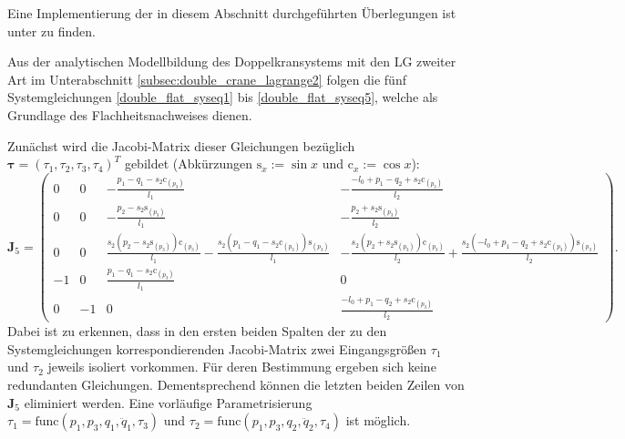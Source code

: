 Eine Implementierung der in diesem Abschnitt durchgeführten Überlegungen ist unter \cite[flatness\_notebooks/ODE\_flatness\_analysis.ipynb]{SAGithub} zu finden.

Aus der analytischen Modellbildung des Doppelkransystems mit den LG zweiter Art im Unterabschnitt \ref{subsec:double_crane_lagrange2} folgen die fünf Systemgleichungen \eqref{double_flat_syseq1} bis \eqref{double_flat_syseq5}, welche als Grundlage des Flachheitsnachweises dienen. 

Zunächst wird die Jacobi-Matrix dieser Gleichungen bezüglich $\boldsymbol{\tau} = (\tau_1, \tau_2, \tau_3, \tau_4)^T$ gebildet (Abkürzungen $\mathrm{s}_x := \sin{x}$ und $\mathrm{c}_x := \cos{x}$):
\begin{equation*}
	\mathbf{J}_5 = 
	\left(\begin{smallmatrix}
	0 & 0 & - \frac{p_{1} - q_{1} - s_{2} \mathrm{c}_{\left(p_{3} \right)}}{l_{1}} & - \frac{- l_{0} + p_{1} - q_{2} + s_{2} \mathrm{c}_{\left(p_{3} \right)}}{l_{2}}\\
	0 & 0 & - \frac{p_{2} - s_{2} \mathrm{s}_{\left(p_{3} \right)}}{l_{1}} & - \frac{p_{2} + s_{2} \mathrm{s}_{\left(p_{3} \right)}}{l_{2}}\\
	0 & 0 & \frac{s_{2} \left(p_{2} - s_{2} \mathrm{s}_{\left(p_{3} \right)}\right) \mathrm{c}_{\left(p_{3} \right)}}{l_{1}} - \frac{s_{2} \left(p_{1} - q_{1} - s_{2} \mathrm{c}_{\left(p_{3} \right)}\right) \mathrm{s}_{\left(p_{3} \right)}}{l_{1}} & - \frac{s_{2} \left(p_{2} + s_{2} \mathrm{s}_{\left(p_{3} \right)}\right) \mathrm{c}_{\left(p_{3} \right)}}{l_{2}} + \frac{s_{2} \left(- l_{0} + p_{1} - q_{2} + s_{2} \mathrm{c}_{\left(p_{3} \right)}\right) \mathrm{s}_{\left(p_{3} \right)}}{l_{2}}\\
	-1 & 0 & \frac{p_{1} - q_{1} - s_{2} \mathrm{c}_{\left(p_{3} \right)}}{l_{1}} & 0\\
	0 & -1 & 0 & \frac{- l_{0} + p_{1} - q_{2} + s_{2} \mathrm{c}_{\left(p_{3} \right)}}{l_{2}}
	\end{smallmatrix}\right).
\end{equation*}
Dabei ist zu erkennen, dass in den ersten beiden Spalten der zu den Systemgleichungen korrespondierenden Jacobi-Matrix zwei Eingangsgrößen $\tau_{1}$ und $\tau_{2}$ jeweils isoliert vorkommen. Für deren Bestimmung ergeben sich keine redundanten Gleichungen. Dementsprechend können die letzten beiden Zeilen von $\mathbf{J}_5$ eliminiert werden. Eine vorläufige Parametrisierung $\tau_1 = \mathrm{func}(p_1, p_3, q_1, \ddot{q}_1, \tau_3)$ und $\tau_2 = \mathrm{func}(p_1, p_3, q_2, \ddot{q}_2, \tau_4)$ ist möglich.

